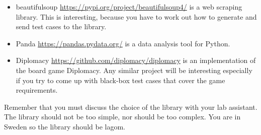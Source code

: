 \documentclass[a4paper]{article}
\begin{document}
\begin{itemize}
\item beautifulsoup \url{https://pypi.org/project/beautifulsoup4/}
  is a web scraping library. This is interesting, because you have to
  work out how to generate and send test cases to the library.
\item Panda \url{https://pandas.pydata.org/} is a data analysis tool
  for Python.
\item Diplomacy \url{https://github.com/diplomacy/diplomacy} is an
  implementation of the board game Diplomacy. Any similar project will
  be interesting especially if you try to come up with black-box test
  cases that cover the game requirements.
\end{itemize}

Remember that you must discuss the choice of the library with your lab
assistant. The library should not be too simple, nor should be too
complex. You are in Sweden so the library should be lagom.
\end{document}
